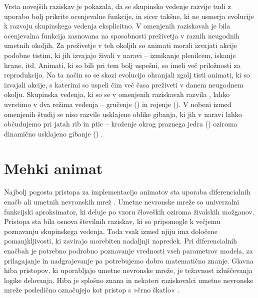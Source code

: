 \begin{razsirjeniPovzetek}
Vrsta novejših raziskav \cite{biswas2014causes,hein2015evolution,olson2013predator,olson2015exploring,olson2016evolution,witkowski2016emergence} je pokazala, da se skupinsko vedenje razvije tudi z uporabo bolj prikrite ocenjevalne funkcije, in sicer takšne, ki ne usmerja evolucije k razvoju skupinskega vedenja eksplicitno. V omenjenih raziskavah je bila ocenjevalna funkcija zasnovana na sposobnosti preživetja v raznih neugodnih umetnih okoljih. Za preživetje v teh okoljih so animati morali izvajati akcije podobne tistim, ki jih izvajajo živali v naravi -- izmikanje plenilcem, iskanje hrane, itd. Animati, ki so bili pri tem bolj uspešni, so imeli več priložnosti za reprodukcijo. Na ta način so se skozi evolucijo ohranjali zgolj tisti animati, ki so izvajali akcije, s katerimi so uspeli čim več časa preživeti v danem neugodnem okolju. Skupinska vedenja, ki so se v omenjenih raziskavah razvila \cite{biswas2014causes,hein2015evolution,olson2013predator,olson2015exploring,olson2016evolution,witkowski2016emergence}, lahko uvrstimo v dva režima vedenja -- gručenje () in rojenje (). V nobeni izmed omenjenih študij se niso razvile usklajene oblike gibanja, ki jih v naravi lahko občudujemo pri jatah rib in ptic -- kroženje okrog praznega jedra () oziroma dinamično usklajeno gibanje () \cite{couzin2002collective,sumpter2006principles}.

\section{Mehki animat}

Najbolj pogosta pristopa za implementacijo animatov sta uporaba diferencialnih enačb \cite{couzin2002collective,hildenbrandt2010selforganized,reynolds1987flocks,vicsek2012collective} ali umetnih nevronskih mrež \cite{kunz2006prey,witkowski2016emergence,zaera1996not}. Umetne nevronske mreže so univerzalni funkcijski aproksimator, ki deluje po vzoru človeških oziroma živalskih možganov. Pristopa sta bila osnova številnih raziskav, ki so pripomogle k večjemu poznavanju skupinskega vedenja. Toda vsak izmed njiju ima določene pomanjkljivosti, ki zavirajo morebiten nadaljnji napredek. Pri diferencialnih enačbah je potrebno podrobno poznavanje vrednosti vseh parametrov modela, za prilagajanje in nadgrajevanje pa potrebujemo dobro matematično znanje. Glavna hiba pristopov, ki uporabljajo umetne nevronske mreže, je težavnost izluščevanja logike delovanja. Hiba je splošno znana in nekateri raziskovalci umetne nevronske mreže posledično označujejo kot pristop s »črno škatlo« \cite{paruelo1997prediction,lek1999artificial,ozesmi1999artificial}.


\end{razsirjeniPovzetek}
